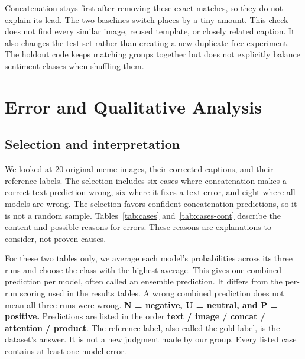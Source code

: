 \documentclass[11pt,a4paper]{article}
\begin{document}
Concatenation stays first after removing these exact matches, so they do not explain its lead. The two baselines switch places by a tiny amount. This check does not find every similar image, reused template, or closely related caption. It also changes the test set rather than creating a new duplicate-free experiment. The holdout code keeps matching groups together but does not explicitly balance sentiment classes when shuffling them.

\section{Error and Qualitative Analysis}
\label{sec:error}

\subsection{Selection and interpretation}
We looked at 20 original meme images, their corrected captions, and their reference labels. The selection includes six cases where concatenation makes a correct text prediction wrong, six where it fixes a text error, and eight where all models are wrong. The selection favors confident concatenation predictions, so it is not a random sample. Tables~\ref{tab:cases} and~\ref{tab:cases-cont} describe the content and possible reasons for errors. These reasons are explanations to consider, not proven causes.

For these two tables only, we average each model's probabilities across its three runs and choose the class with the highest average. This gives one combined prediction per model, often called an ensemble prediction. It differs from the per-run scoring used in the results tables. A wrong combined prediction does not mean all three runs were wrong. \textbf{N = negative, U = neutral, and P = positive.} Predictions are listed in the order \textbf{text / image / concat / attention / product}. The reference label, also called the gold label, is the dataset's answer. It is not a new judgment made by our group. Every listed case contains at least one model error.
\end{document}
